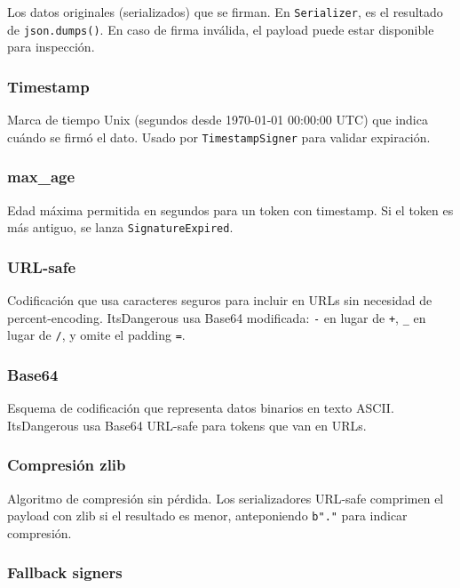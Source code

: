 \documentclass[11pt,a4paper]{article}
\begin{document}
Los datos originales (serializados) que se firman. En \texttt{Serializer}, es el resultado de \texttt{json.dumps()}. En caso de firma inválida, el payload puede estar disponible para inspección.


\subsubsection*{Timestamp}


Marca de tiempo Unix (segundos desde 1970-01-01 00:00:00 UTC) que indica cuándo se firmó el dato. Usado por \texttt{TimestampSigner} para validar expiración.


\subsubsection*{max\_age}


Edad máxima permitida en segundos para un token con timestamp. Si el token es más antiguo, se lanza \texttt{SignatureExpired}.


\subsubsection*{URL-safe}


Codificación que usa caracteres seguros para incluir en URLs sin necesidad de percent-encoding. ItsDangerous usa Base64 modificada: \texttt{-} en lugar de \texttt{+}, \texttt{\_} en lugar de \texttt{/}, y omite el padding \texttt{=}.


\subsubsection*{Base64}


Esquema de codificación que representa datos binarios en texto ASCII. ItsDangerous usa Base64 URL-safe para tokens que van en URLs.


\subsubsection*{Compresión zlib}


Algoritmo de compresión sin pérdida. Los serializadores URL-safe comprimen el payload con zlib si el resultado es menor, anteponiendo \texttt{b"."} para indicar compresión.


\subsubsection*{Fallback signers}
\end{document}
